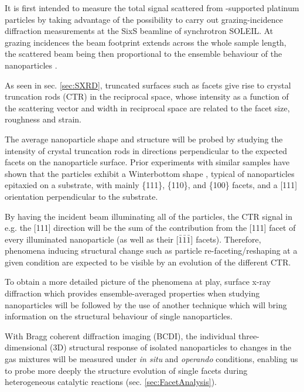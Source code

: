 It is first intended to measure the total signal scattered from -supported platinum particles by taking advantage of the possibility to carry out grazing-incidence diffraction measurements at the SixS beamline of synchrotron SOLEIL.
At grazing incidences the beam footprint extends across the whole sample length, the scattered beam being then proportional to the ensemble behaviour of the nanoparticles \parencite{Nolte2008, Hejral2013, Hejral2016}.

As seen in sec. \ref{sec:SXRD}, truncated surfaces such as facets give rise to crystal truncation rods (CTR) in the reciprocal space, whose intensity as a function of the scattering vector and width in reciprocal space are related to the facet size, roughness and strain.

The average nanoparticle shape and structure will be probed by studying the intensity of crystal truncation rods in directions perpendicular to the expected facets on the nanoparticle surface.
Prior experiments with similar samples \parencite{Dupraz2017, Li2020, Lim2021, Dupraz2022} have shown that the particles exhibit a Winterbottom shape \parencite{Winterbottom1967, Boukouvala2021}, typical of nanoparticles epitaxied on a substrate, with mainly \{111\}, \{110\}, and \{100\} facets, and a [111] orientation perpendicular to the substrate.

By having the incident beam illuminating all of the particles, the CTR signal in e.g. the [111] direction will be the sum of the contribution from the [111] facet of every illuminated nanoparticle (as well as their [$\bar{1}\bar{1}\bar{1}$] facets).
Therefore, phenomena inducing structural change such as particle re-faceting/reshaping at a given condition are expected to be visible by an evolution of the different CTR.

To obtain a more detailed picture of the phenomena at play, surface x-ray diffraction which provides ensemble-averaged properties when studying nanoparticles will be followed by the use of another technique which will bring information on the structural behaviour of single nanoparticles.

With Bragg coherent diffraction imaging (BCDI), the individual three-dimensional (3D) structural response of isolated nanoparticles to changes in the gas mixtures will be measured under \textit{in situ} and \textit{operando} conditions, enabling us to probe more deeply the structure evolution of single facets during heterogeneous catalytic reactions (sec. \ref{sec:FacetAnalysis}).

